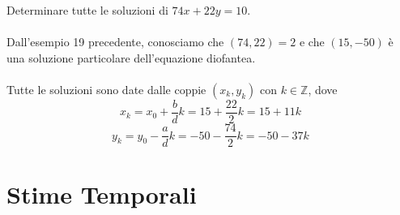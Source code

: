 \documentclass[a4paper,12pt, oneside]{book}
\begin{document}
	\begin{shaded}
		\begin{esempio}
			Determinare tutte le soluzioni di $74x+22y=10$.\\\\
			Dall'esempio 19 precedente, conosciamo che $(74,22) = 2$ e che $(15,-50)$ è una soluzione particolare dell'equazione diofantea.\\\\
			Tutte le soluzioni sono date dalle coppie $(x_k,y_k)$ con $k \in \mathbb{Z}$, dove
			$$x_k = x_0 + \frac{b}{d}k = 15+\frac{22}{2}k = 15 + 11k$$
			$$y_k = y_0 - \frac{a}{d}k = -50-\frac{74}{2}k = -50-37k$$
		\end{esempio}
	\end{shaded}
	
\chapter{Stime Temporali}
\end{document}
